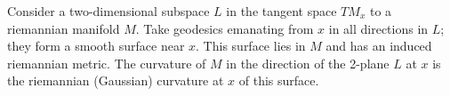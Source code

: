 Consider a two-dimensional subspace $L$ in the tangent space $TM_x$ to a riemannian manifold $M$. Take geodesics emanating from $x$ in all directions in $L$; they form a smooth surface near $x$. This surface lies in $M$ and has an induced riemannian metric. The curvature of $M$ in the direction of the 2-plane $L$ at $x$ is the riemannian (Gaussian) curvature at $x$ of this surface.
